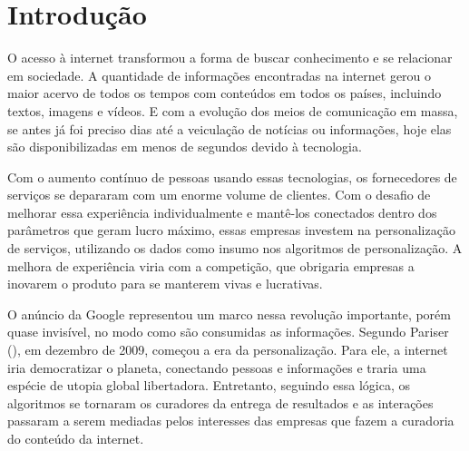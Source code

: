 \chapter{Introdução}


O acesso à internet transformou a forma de buscar conhecimento e se relacionar em sociedade. A quantidade de informações encontradas na internet gerou o maior acervo de todos os tempos com conteúdos em todos os países, incluindo textos, imagens e vídeos. E com a evolução dos meios de comunicação em massa, se antes já foi preciso dias até a veiculação de notícias ou informações, hoje elas são disponibilizadas em menos de segundos devido à tecnologia.

Com o aumento contínuo de pessoas usando essas tecnologias, os fornecedores de serviços se depararam com um enorme volume de clientes. Com o desafio de  melhorar essa experiência individualmente e mantê-los conectados dentro dos parâmetros que geram lucro máximo, essas empresas investem na personalização de serviços, 
utilizando os dados como insumo nos algoritmos de personalização. A melhora de experiência viria com a competição, que obrigaria empresas a inovarem o produto para se manterem vivas e lucrativas.


O anúncio da Google representou um marco nessa revolução importante, porém quase invisível, no modo como são consumidas as informações. Segundo Pariser (\citeyear{pariser2012}), em dezembro de 2009, começou a era da personalização. Para ele, a internet iria democratizar o planeta, conectando pessoas e informações e traria uma espécie de utopia global libertadora. Entretanto, seguindo essa lógica, os algoritmos se tornaram os curadores da entrega de resultados e as interações passaram a serem mediadas pelos interesses das empresas que fazem a curadoria do conteúdo da internet. %

